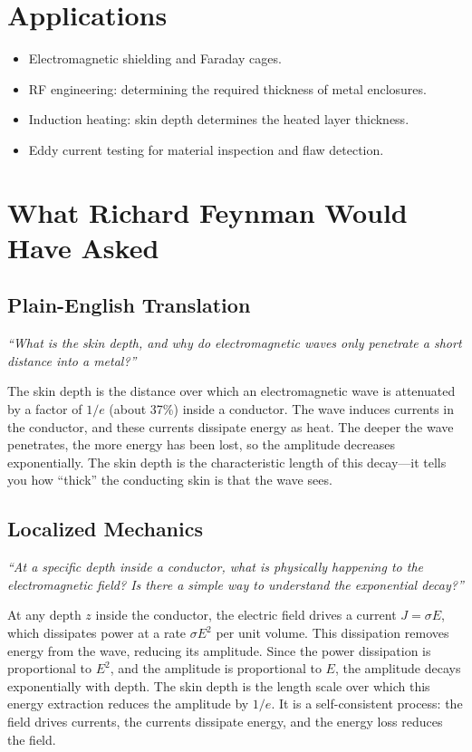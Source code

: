 \documentclass[11pt,openright]{book}
\begin{document}
\section*{Applications}

\begin{itemize}
    \item Electromagnetic shielding and Faraday cages.
    \item RF engineering: determining the required thickness of metal enclosures.
    \item Induction heating: skin depth determines the heated layer thickness.
    \item Eddy current testing for material inspection and flaw detection.
\end{itemize}
\section*{What Richard Feynman Would Have Asked}

\subsection*{Plain-English Translation}
\textit{``What is the skin depth, and why do electromagnetic waves only penetrate a short distance into a metal?''}

The skin depth is the distance over which an electromagnetic wave is attenuated by a factor of $1/e$ (about 37\%) inside a conductor. The wave induces currents in the conductor, and these currents dissipate energy as heat. The deeper the wave penetrates, the more energy has been lost, so the amplitude decreases exponentially. The skin depth is the characteristic length of this decay---it tells you how ``thick'' the conducting skin is that the wave sees.

\subsection*{Localized Mechanics}
\textit{``At a specific depth inside a conductor, what is physically happening to the electromagnetic field? Is there a simple way to understand the exponential decay?''}

At any depth $z$ inside the conductor, the electric field drives a current $J = \sigma E$, which dissipates power at a rate $\sigma E^2$ per unit volume. This dissipation removes energy from the wave, reducing its amplitude. Since the power dissipation is proportional to $E^2$, and the amplitude is proportional to $E$, the amplitude decays exponentially with depth. The skin depth is the length scale over which this energy extraction reduces the amplitude by $1/e$. It is a self-consistent process: the field drives currents, the currents dissipate energy, and the energy loss reduces the field.
\end{document}
